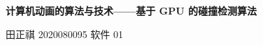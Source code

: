 \begin{center}
    \Large\textbf{计算机动画的算法与技术——基于 GPU 的碰撞检测算法}
    \vspace{1em}

    \normalsize 田正祺 \hspace{1em} 2020080095 \hspace{1em} 软件 01
\end{center}